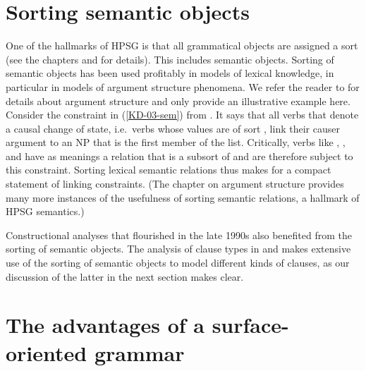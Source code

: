 \documentclass[output=paper,biblatex,babelshorthands,newtxmath,draftmode,colorlinks,citecolor=brown]{langscibook}
\begin{document}
\section{Sorting semantic objects}

One of the hallmarks of HPSG is that all grammatical objects are assigned a sort (see the chapters  and  for details). This includes semantic objects. Sorting of semantic objects has been used profitably in models of lexical knowledge, in particular in models of argument structure phenomena. We refer the reader to  for details about argument structure and only provide an illustrative example here. Consider the constraint in (\ref{KD-03-sem}) from \citet[231]{KoenigandDavis2003}. It says that all verbs that denote a causal change of state, i.e.\ verbs whose  values are of sort ,
 link their causer argument to an NP that is the first member of the  list. 
\ea\label{KD-03-sem}
\impl{}
\z
Critically, verbs like , , and  have as meanings a relation that is a subsort of  and are therefore subject to this constraint.  Sorting lexical semantic relations thus makes for a compact statement of linking constraints. (The chapter on argument structure provides many more instances of the usefulness of sorting semantic relations, a hallmark of HPSG semantics.)


Constructional analyses that flourished in the late 1990s also benefited from the sorting of semantic objects. The analysis  of clause types in \citet{Sag1997} and \citet{GinzburgandSag2001} makes extensive use of the sorting of semantic objects to model different kinds of clauses, as our discussion of the latter in the next section makes clear.

\section{The advantages of a surface-oriented grammar}
\label{sec:adv}
\end{document}
